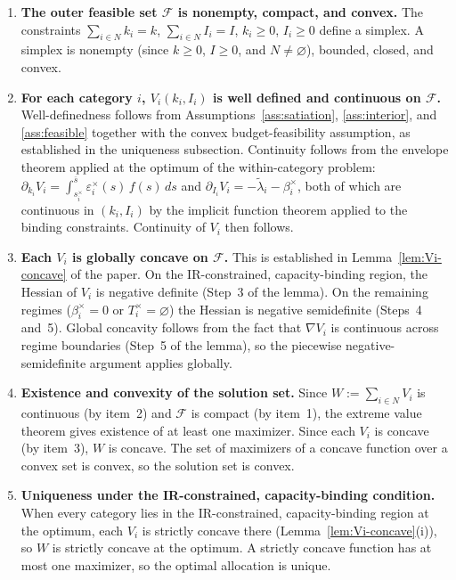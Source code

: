 \documentclass[master.tex]{subfiles}
\begin{document}
\begin{enumerate}[label=\arabic*.]
    \item \textbf{The outer feasible set $\mathcal{F}$ is nonempty, compact, and convex.}
    The constraints $\sum_{i\in N} k_i = k$, $\sum_{i\in N} I_i = I$, $k_i\ge 0$, $I_i\ge 0$ define a simplex. A simplex is nonempty (since $k\ge 0$, $I\ge 0$, and $N\neq\varnothing$), bounded, closed, and convex.

    \item \textbf{For each category $i$, $V_i(k_i,I_i)$ is well defined and continuous on $\mathcal{F}$.}
    Well-definedness follows from Assumptions~\ref{ass:satiation}, \ref{ass:interior}, and \ref{ass:feasible} together with the convex budget-feasibility assumption, as established in the uniqueness subsection. Continuity follows from the envelope theorem applied at the optimum of the within-category problem: $\partial_{k_i}V_i = \int_{s_i^\times}^{\overline s}\varepsilon_i^\times(s)\,f(s)\,ds$ and $\partial_{I_i}V_i = -\tilde\lambda_i - \beta_i^\times$, both of which are continuous in $(k_i,I_i)$ by the implicit function theorem applied to the binding constraints. Continuity of $V_i$ then follows.

    \item \textbf{Each $V_i$ is globally concave on $\mathcal{F}$.}
    This is established in Lemma~\ref{lem:Vi-concave} of the paper. On the IR-constrained, capacity-binding region, the Hessian of $V_i$ is negative definite (Step~3 of the lemma). On the remaining regimes ($\beta_i^\times=0$ or $T_i^\times=\varnothing$) the Hessian is negative semidefinite (Steps~4 and~5). Global concavity follows from the fact that $\nabla V_i$ is continuous across regime boundaries (Step~5 of the lemma), so the piecewise negative-semidefinite argument applies globally.

    \item \textbf{Existence and convexity of the solution set.}
    Since $W := \sum_{i\in N} V_i$ is continuous (by item~2) and $\mathcal{F}$ is compact (by item~1), the extreme value theorem gives existence of at least one maximizer. Since each $V_i$ is concave (by item~3), $W$ is concave. The set of maximizers of a concave function over a convex set is convex, so the solution set is convex.

    \item \textbf{Uniqueness under the IR-constrained, capacity-binding condition.}
    When every category lies in the IR-constrained, capacity-binding region at the optimum, each $V_i$ is strictly concave there (Lemma~\ref{lem:Vi-concave}(i)), so $W$ is strictly concave at the optimum. A strictly concave function has at most one maximizer, so the optimal allocation is unique.
\end{enumerate}
\end{document}
